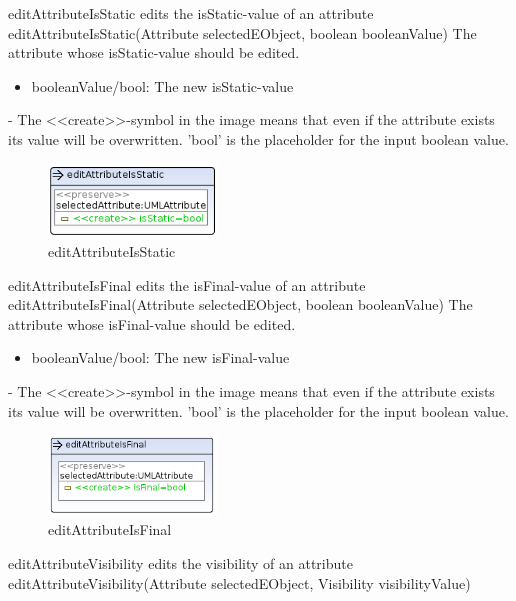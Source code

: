 \op
{editAttributeIsStatic}
{edits the isStatic-value of an attribute}
{editAttributeIsStatic(Attribute selectedEObject, boolean booleanValue)}
{The attribute whose isStatic-value should be edited.}
{
\begin{itemize}
 \item booleanValue/bool: The new isStatic-value
\end{itemize}
}
{-}
{The \textless\textless create\textgreater\textgreater  -symbol in the image
means that even if the attribute exists its value will be overwritten.
'bool' is the placeholder for the input boolean value.}
\begin{figure}[H]
  \centering
  \includegraphics[width=0.4\textwidth]{pics/editAttributeIsStatic.png}    
  \caption{editAttributeIsStatic}
  \label{editAttributeIsStatic}  
\end{figure}
\op
{editAttributeIsFinal}
{edits the isFinal-value of an attribute}
{editAttributeIsFinal(Attribute selectedEObject, boolean booleanValue)}
{The attribute whose isFinal-value should be edited.}
{
\begin{itemize}
 \item booleanValue/bool: The new isFinal-value
\end{itemize}
}
{-}
{The \textless\textless create\textgreater\textgreater  -symbol in the image
means that even if the attribute exists its value will be overwritten.
'bool' is the placeholder for the input boolean value.}
\begin{figure}[H]
  \centering
  \includegraphics[width=0.4\textwidth]{pics/editAttributeIsFinal.png}    
  \caption{editAttributeIsFinal}
  \label{editAttributeIsFinal}  
\end{figure}
\op
{editAttributeVisibility}
{edits the visibility of an attribute}
{editAttributeVisibility(Attribute selectedEObject, Visibility visibilityValue)}
